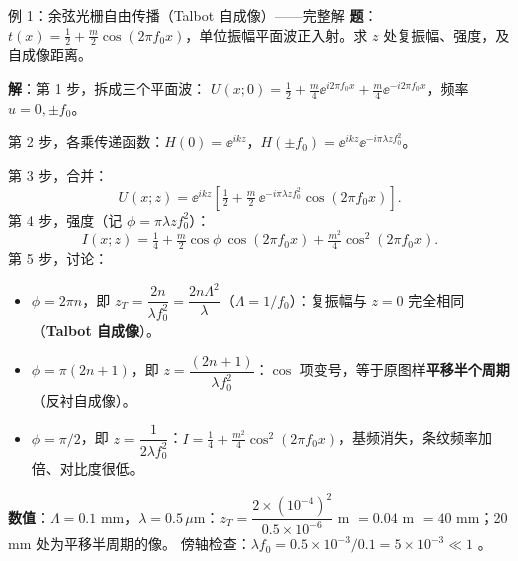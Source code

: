 \begin{exam}{例 1：余弦光栅自由传播（Talbot 自成像）——完整解}\label{ex:talbot}
\textbf{题}：$t(x)=\frac12+\frac m2\cos(2\pi f_0x)$，单位振幅平面波正入射。求 $z$ 处复振幅、强度，及自成像距离。

\textbf{解}：第 1 步，拆成三个平面波：
$U(x;0)=\frac12+\frac m4\ee^{i2\pi f_0x}+\frac m4\ee^{-i2\pi f_0x}$，频率 $u=0,\pm f_0$。

第 2 步，各乘传递函数：$H(0)=\ee^{ikz}$，$H(\pm f_0)=\ee^{ikz}\ee^{-i\pi\lambda zf_0^2}$。

第 3 步，合并：
\[
U(x;z)=\ee^{ikz}\left[\tfrac12+\tfrac m2\,\ee^{-i\pi\lambda zf_0^2}\cos(2\pi f_0x)\right].
\]
第 4 步，强度（记 $\phi=\pi\lambda zf_0^2$）：
\[
I(x;z)=\tfrac14+\tfrac m2\cos\phi\,\cos(2\pi f_0x)+\tfrac{m^2}4\cos^2(2\pi f_0x).
\]
第 5 步，讨论：
\begin{itemize}
\item $\phi=2\pi n$，即 $\boxed{z_T=\dfrac{2n}{\lambda f_0^2}=\dfrac{2n\Lambda^2}{\lambda}}$（$\Lambda=1/f_0$）：复振幅与 $z=0$ 完全相同（\textbf{Talbot 自成像}）。
\item $\phi=\pi(2n+1)$，即 $z=\dfrac{(2n+1)}{\lambda f_0^2}$：$\cos$ 项变号，等于原图样\textbf{平移半个周期}（反衬自成像）。
\item $\phi=\pi/2$，即 $z=\dfrac{1}{2\lambda f_0^2}$：$I=\frac14+\frac{m^2}{4}\cos^2(2\pi f_0x)$，基频消失，条纹频率加倍、对比度很低。
\end{itemize}
\textbf{数值}：$\Lambda=0.1$ mm，$\lambda=0.5\,\mu$m：$z_T=\dfrac{2\times(10^{-4})^2}{0.5\times10^{-6}}$ m $=0.04$ m $=40$ mm；20 mm 处为平移半周期的像。
傍轴检查：$\lambda f_0=0.5\times10^{-3}/0.1=5\times10^{-3}\ll1$ \checkmark。
\end{exam}

